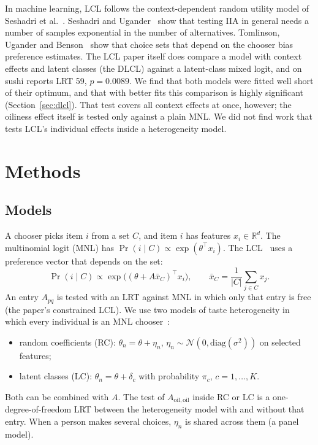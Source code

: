 \documentclass[11pt,journal,a4paper]{IEEEtran}
\newcommand{\Aoo}{A_{\mathrm{oil,oil}}}
\newcommand{\xb}{\bar{x}}
\begin{document}
In machine learning, LCL follows the context-dependent random utility model of Seshadri et
al.~\cite{spu19}. Seshadri and Ugander~\cite{su20} show that testing IIA in general needs a number of samples
exponential in the number of alternatives. Tomlinson, Ugander and Benson~\cite{tub21} show that choice sets
that depend on the chooser bias preference estimates. The LCL paper itself does compare a model with
context effects and latent classes (the DLCL) against a latent-class mixed logit, and on sushi reports
LRT 59, $p=0.0089$. We find that both models were fitted well short of their optimum, and that with better
fits this comparison is highly significant (Section~\ref{sec:dlcl}). That test covers all context effects at
once, however; the oiliness effect itself is tested only against a plain MNL. We did not find work that tests
LCL's individual effects inside a heterogeneity model.

\section{Methods}

\subsection{Models}

A chooser picks item $i$ from a set $C$, and item $i$ has features $x_i\in\mathbb{R}^d$. The multinomial
logit (MNL) has $\Pr(i\mid C)\propto\exp(\theta^\top x_i)$. The LCL~\cite{tb21} uses a preference vector that
depends on the set:
\begin{equation}
\Pr(i\mid C)\propto\exp\big((\theta+A\xb_C)^\top x_i\big),\qquad \xb_C=\frac{1}{|C|}\sum_{j\in C}x_j.
\label{eq:lcl}
\end{equation}
An entry $A_{pq}$ is tested with an LRT against MNL in which only that entry is free (the paper's constrained
LCL). We use two models of taste heterogeneity in which every individual is an MNL chooser~\cite{train09}:
\begin{itemize}
\item random coefficients (RC): $\theta_n=\theta+\eta_n$, $\eta_n\sim\mathcal{N}(0,\mathrm{diag}(\sigma^2))$
      on selected features;
\item latent classes (LC): $\theta_n=\theta+\delta_c$ with probability $\pi_c$, $c=1,\dots,K$.
\end{itemize}
Both can be combined with $A$. The test of $\Aoo$ inside RC or LC is a one-degree-of-freedom LRT between the
heterogeneity model with and without that entry. When a person makes several choices, $\eta_n$ is shared
across them (a panel model).
\end{document}
